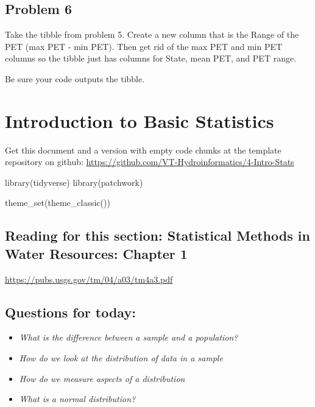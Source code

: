 \documentclass[
]{book}
\newenvironment{Shaded}{\begin{snugshade}}{\end{snugshade}}
\newcommand{\FunctionTok}[1]{\textcolor[rgb]{0.00,0.00,0.00}{#1}}
\newcommand{\NormalTok}[1]{#1}
\providecommand{\tightlist}{%
  \setlength{\itemsep}{0pt}\setlength{\parskip}{0pt}}
\begin{document}
\hypertarget{problem-6}{%
\section{Problem 6}\label{problem-6}}

Take the tibble from problem 5. Create a new column that is the Range of the PET (max PET - min PET). Then get rid of the max PET and min PET columns so the tibble just has columns for State, mean PET, and PET range.

Be sure your code outputs the tibble.

\hypertarget{stats}{%
\chapter{Introduction to Basic Statistics}\label{stats}}

Get this document and a version with empty code chunks at the template repository on github: \url{https://github.com/VT-Hydroinformatics/4-Intro-Stats}

\begin{Shaded}
\begin{Highlighting}[]
\FunctionTok{library}\NormalTok{(tidyverse)}
\FunctionTok{library}\NormalTok{(patchwork)}

\FunctionTok{theme\_set}\NormalTok{(}\FunctionTok{theme\_classic}\NormalTok{())}
\end{Highlighting}
\end{Shaded}

\hypertarget{reading-for-this-section-statistical-methods-in-water-resources-chapter-1}{%
\section{Reading for this section: Statistical Methods in Water Resources: Chapter 1}\label{reading-for-this-section-statistical-methods-in-water-resources-chapter-1}}

\url{https://pubs.usgs.gov/tm/04/a03/tm4a3.pdf}

\hypertarget{questions-for-today}{%
\section{Questions for today:}\label{questions-for-today}}

\begin{itemize}
\tightlist
\item
  \emph{What is the difference between a sample and a population?}
\item
  \emph{How do we look at the distribution of data in a sample}
\item
  \emph{How do we measure aspects of a distribution}
\item
  \emph{What is a normal distribution?}
\end{itemize}
\end{document}
